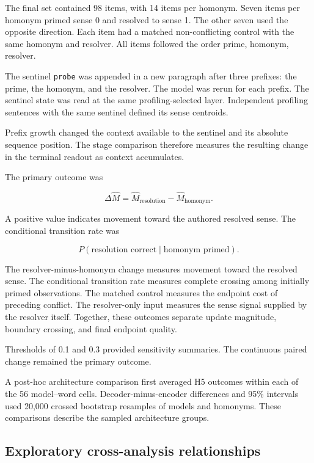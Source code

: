 \documentclass[conference]{IEEEtran}
\begin{document}
The final set contained 98 items, with 14 items per homonym. Seven items per
homonym primed sense 0 and resolved to sense 1. The other seven used the
opposite direction. Each item had a matched non-conflicting control with the
same homonym and resolver. All items followed the order prime, homonym,
resolver.

The sentinel \texttt{probe} was appended in a new paragraph after three
prefixes: the prime, the homonym, and the resolver. The model was rerun for each
prefix. The sentinel state was read at the same profiling-selected layer.
Independent profiling sentences with the same sentinel defined its sense
centroids.

Prefix growth changed the context available to the sentinel and its absolute
sequence position. The stage comparison therefore measures the resulting
change in the terminal readout as context accumulates.

The primary outcome was

\[
\Delta\widehat M=
\widehat M_{\mathrm{resolution}}-
\widehat M_{\mathrm{homonym}}.
\]

A positive value indicates movement toward the authored resolved sense. The
conditional transition rate was

\[
P(\text{resolution correct}\mid\text{homonym primed}).
\]

The resolver-minus-homonym change measures movement toward the resolved sense.
The conditional transition rate measures complete crossing among initially
primed observations. The matched control measures the endpoint cost of
preceding conflict. The resolver-only input measures the sense signal supplied
by the resolver itself. Together, these outcomes separate update magnitude,
boundary crossing, and final endpoint quality.

Thresholds of 0.1 and 0.3 provided sensitivity summaries. The continuous
paired change remained the primary outcome.

A post-hoc architecture comparison first averaged H5 outcomes within each of
the 56 model--word cells. Decoder-minus-encoder differences and 95\% intervals
used 20,000 crossed bootstrap resamples of models and homonyms. These
comparisons describe the sampled architecture groups.

\subsection{Exploratory cross-analysis relationships}
\label{sec:exploratory-methods}
\end{document}
